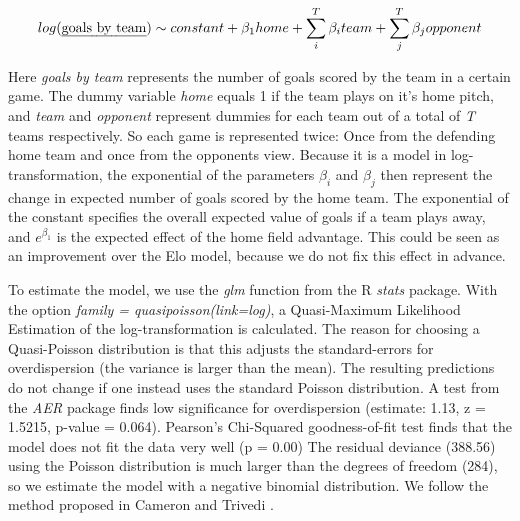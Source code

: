 \documentclass[12pt,a4paper]{article}
\begin{document}
\begin{align}
log(\text{\emph{goals by team}}) \sim constant + \beta_1 home + \sum_{i}^{T} \beta_i team + \sum_{j}^{T} \beta_j opponent
\end{align}

Here \emph{goals by team} represents the number of goals scored by the
team in a certain game. The dummy variable \emph{home} equals 1 if the
team plays on it's home pitch, and \emph{team} and \emph{opponent}
represent dummies for each team out of a total of \emph{T} teams
respectively. So each game is represented twice: Once from the defending
home team and once from the opponents view. Because it is a model in
log-transformation, the exponential of the parameters \(\beta_i\) and
\(\beta_j\) then represent the change in expected number of goals scored
by the home team. The exponential of the constant specifies the overall
expected value of goals if a team plays away, and \(e^{\beta_1}\) is the
expected effect of the home field advantage. This could be seen as an
improvement over the Elo model, because we do not fix this effect in
advance.

To estimate the model, we use the \emph{glm} function from the R
\emph{stats} package. With the option \emph{family =
quasipoisson(link=log)}, a Quasi-Maximum Likelihood Estimation of the
log-transformation is calculated. The reason for choosing a
Quasi-Poisson distribution is that this adjusts the standard-errors for
overdispersion (the variance is larger than the mean). The resulting
predictions do not change if one instead uses the standard Poisson
distribution. A test from the \emph{AER} package finds low significance
for overdispersion (estimate: 1.13, z = 1.5215, p-value = 0.064).
Pearson's Chi-Squared goodness-of-fit test finds that the model does not
fit the data very well (p = 0.00) The residual deviance (388.56) using
the Poisson distribution is much larger than the degrees of freedom
(284), so we estimate the model with a negative binomial distribution.
We follow the method proposed in Cameron and Trivedi
\autocite*{cameron2013}.
\end{document}
